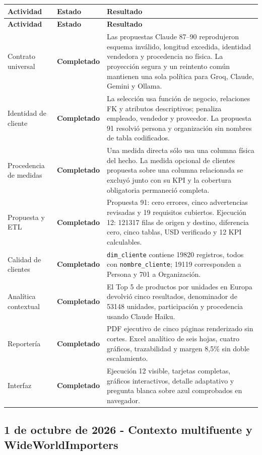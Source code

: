 \documentclass[11pt,letterpaper]{article}
\newcommand{\statusok}{\textcolor{deepgreen}{\textbf{Completado}}}
\newcommand{\file}[1]{\texttt{#1}}
\begin{document}
\begin{longtable}{@{}p{}p{}p{}@{}}
  \toprule
  \textbf{Actividad} & \textbf{Estado} & \textbf{Resultado} \\
  \midrule
  \endfirsthead
  \toprule
  \textbf{Actividad} & \textbf{Estado} & \textbf{Resultado} \\
  \midrule
  \endhead
  Contrato universal & \statusok & Las propuestas Claude 87--90 reprodujeron esquema inválido, longitud excedida, identidad vendedora y procedencia no física. La proyección segura y un reintento común mantienen una sola política para Groq, Claude, Gemini y Ollama. \\
  Identidad de cliente & \statusok & La selección usa función de negocio, relaciones FK y atributos descriptivos; penaliza empleado, vendedor y proveedor. La propuesta 91 resolvió persona y organización sin nombres de tabla codificados. \\
  Procedencia de medidas & \statusok & Una medida directa sólo usa una columna física del hecho. La medida opcional de clientes propuesta sobre una columna relacionada se excluyó junto con su KPI y la cobertura obligatoria permaneció completa. \\
  Propuesta y ETL & \statusok & Propuesta 91: cero errores, cinco advertencias revisadas y 19 requisitos cubiertos. Ejecución 12: 121317 filas de origen y destino, diferencia cero, cinco tablas, USD verificado y 12 KPI calculables. \\
  Calidad de clientes & \statusok & \file{dim\_cliente} contiene 19820 registros, todos con \file{nombre\_cliente}; 19119 corresponden a Persona y 701 a Organización. \\
  Analítica contextual & \statusok & El Top 5 de productos por unidades en Europa devolvió cinco resultados, denominador de 53148 unidades, participación y procedencia usando Claude Haiku. \\
  Reportería & \statusok & PDF ejecutivo de cinco páginas renderizado sin cortes. Excel analítico de seis hojas, cuatro gráficos, trazabilidad y margen 8,5\% sin doble escalamiento. \\
  Interfaz & \statusok & Ejecución 12 visible, tarjetas completas, gráficos interactivos, detalle adaptativo y pregunta blanca sobre azul comprobados en navegador. \\
  \bottomrule
\end{longtable}

\subsection{1 de octubre de 2026 - Contexto multifuente y WideWorldImporters}
\end{document}
